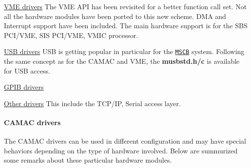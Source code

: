 \begin{DoxyItemize}
\item \hyperlink{FE_Hardware_VME_drivers}{VME drivers} The VME API has been revisited for a better function call set. Not all the hardware modules have been ported to this new scheme. DMA and Interrupt support have been included. The main hardware support is for the SBS PCI/VME, SIS PCI/VME, VMIC processor.
\end{DoxyItemize}


\begin{DoxyItemize}
\item \hyperlink{FE_Hardware_USB_drivers}{USB drivers} USB is getting popular in particular for the \href{http://midas.psi.ch/mscb/}{\tt MSCB} system. Following the same concept as for the CAMAC and VME, the {\bfseries musbstd.h/c} is available for USB access.
\end{DoxyItemize}


\begin{DoxyItemize}
\item \hyperlink{FE_Hardware_GPIB_drivers}{GPIB drivers}
\end{DoxyItemize}


\begin{DoxyItemize}
\item \hyperlink{FE_Hardware_Other_drivers}{Other drivers} This include the TCP/IP, Serial access layer.
\end{DoxyItemize}

\label{FE_Hardware_idx_Hardware_drivers_CAMAC}
\hypertarget{FE_Hardware_idx_Hardware_drivers_CAMAC}{}
 

 \hypertarget{FE_Hardware_CAMAC_drivers}{}\paragraph{CAMAC drivers}\label{FE_Hardware_CAMAC_drivers}
The CAMAC drivers can be used in different configuration and may have special behaviors depending on the type of hardware involved. Below are summurized some remarks about these particular hardware modules.


